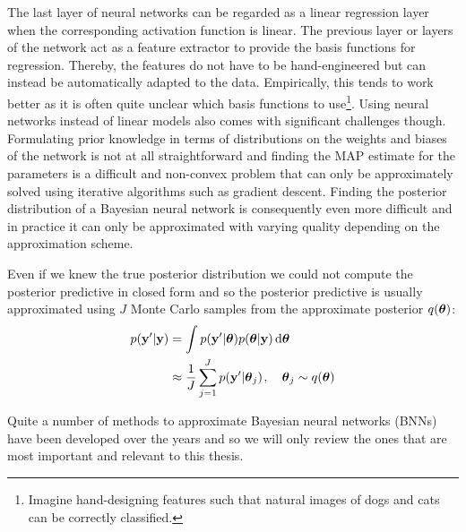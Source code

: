 \documentclass[../thesis.tex]{subfiles}
\begin{document}
The last layer of neural networks can be regarded as a linear regression layer when the corresponding activation function is linear. The previous layer or layers of the network act as a feature extractor to provide the basis functions for regression. Thereby, the features do not have to be hand-engineered but can instead be automatically adapted to the data. Empirically, this tends to work better as it is often quite unclear which basis functions to use\footnote{Imagine hand-designing features such that natural images of dogs and cats can be correctly classified.}. Using neural networks instead of linear models also comes with significant challenges though. Formulating prior knowledge in terms of distributions on the weights and biases of the network is not at all straightforward and finding the MAP estimate for the parameters is a difficult and non-convex problem that can only be approximately solved using iterative algorithms such as gradient descent. Finding the posterior distribution of a Bayesian neural network is consequently even more difficult and in practice it can only be approximated with varying quality depending on the approximation scheme.

Even if we knew the true posterior distribution we could not compute the posterior predictive in closed form and so the posterior predictive is usually approximated using $J$ Monte Carlo samples from the approximate posterior $q(\boldsymbol{\mathbf{\theta}})$:
\begin{equation}
    \begin{split}
        p(\boldsymbol{\mathbf{y}}' | \boldsymbol{\mathbf{y}}) &= \int p(\boldsymbol{\mathbf{y}}' | \boldsymbol{\mathbf{\theta}}) p(\boldsymbol{\mathbf{\theta}} | \boldsymbol{\mathbf{y}}) \mathop{}\!\mathrm{d}\boldsymbol{\mathbf{\theta}} \\
        &\approx \frac{1}{J} \sum_{j=1}^J p(\boldsymbol{\mathbf{y}}' | \boldsymbol{\mathbf{\theta}}_j) \hspace{0.1em}, \hspace{1em} \boldsymbol{\mathbf{\theta}}_j \sim q(\boldsymbol{\mathbf{\theta}}) \label{eq:monte-carlo-posterior-predictive}
    \end{split}
\end{equation}

Quite a number of methods to approximate Bayesian neural networks (BNNs) have been developed over the years and so we will only review the ones that are most important and relevant to this thesis.
\end{document}
